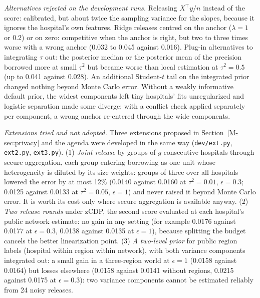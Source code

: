 \documentclass[acmsmall,screen,nonacm]{acmart}
\theoremstyle{acmdefinition}
\begin{document}
\emph{Alternatives rejected on the development runs.} Releasing $X^\top y/n$ instead of the score: calibrated, but about twice the sampling variance for the slopes, because it ignores the hospital's own features. Ridge releases centred on the anchor ($\lambda=1$ or $0.2$) or on zero: competitive when the anchor is right, but two to three times worse with a wrong anchor (0.032 to 0.045 against 0.016). Plug-in alternatives to integrating $\tau$ out: the posterior median or the posterior mean of the precision borrowed more at small $\tau^2$ but became worse than local estimation at $\tau^2=0.5$ (up to 0.041 against 0.028). An additional Student-$t$ tail on the integrated prior changed nothing beyond Monte Carlo error. Without a weakly informative default prior, the widest components left tiny hospitals' fits unregularized and logistic separation made some diverge; with a conflict check applied separately per component, a wrong anchor re-entered through the wide components.

\emph{Extensions tried and not adopted.} Three extensions proposed in Section~\ref{M-sec:privacy} and the agenda were developed in the same way (\texttt{dev/ext.py}, \texttt{ext2.py}, \texttt{ext3.py}). (1) \emph{Joint release} by groups of $g$ consecutive hospitals through secure aggregation, each group entering borrowing as one unit whose heterogeneity is diluted by its size weights: groups of three over all hospitals lowered the error by at most 12\% (0.0140 against 0.0160 at $\tau^2=0.01$, $\epsilon=0.3$; 0.0125 against 0.0133 at $\tau^2=0.05$, $\epsilon=1$) and never raised it beyond Monte Carlo error. It is worth its cost only where secure aggregation is available anyway. (2) \emph{Two release rounds} under zCDP, the second score evaluated at each hospital's public network estimate: no gain in any setting (for example 0.0176 against 0.0177 at $\epsilon=0.3$, 0.0138 against 0.0135 at $\epsilon=1$), because splitting the budget cancels the better linearization point. (3) \emph{A two-level prior} for public region labels (hospital within region within network), with both variance components integrated out: a small gain in a three-region world at $\epsilon=1$ (0.0158 against 0.0164) but losses elsewhere (0.0158 against 0.0141 without regions, 0.0215 against 0.0175 at $\epsilon=0.3$): two variance components cannot be estimated reliably from 24 noisy releases.




\end{document}
